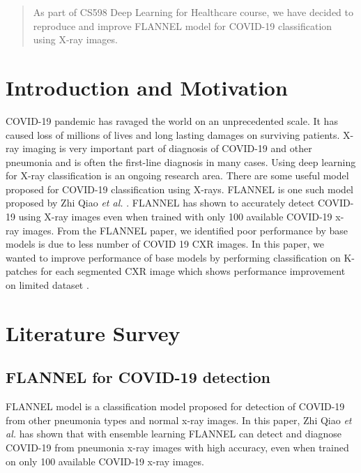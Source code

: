 \documentclass{sigkddExp}
\begin{document}
\date{28 March 2021}
\maketitle
\begin{abstract}
    As part of CS598 Deep Learning for Healthcare course, we have decided to
    reproduce and improve FLANNEL model\cite{10.1093/jamia/ocaa280} for COVID-19
    classification using X-ray images.
\end{abstract}

\section{Introduction and Motivation}
COVID-19 pandemic has ravaged the world on an unprecedented scale. It has caused
loss of millions of lives and long lasting damages on surviving patients. X-ray
imaging is very important part of diagnosis of COVID-19 and other pneumonia and
is often the first-line diagnosis in many cases. Using deep learning for X-ray
classification is an ongoing research area. There are some useful model proposed
for COVID-19 classification using X-rays. FLANNEL is one such model proposed by
Zhi Qiao \textit{et al.} \cite{10.1093/jamia/ocaa280}. FLANNEL has shown to
accurately detect COVID-19 using X-ray images even when trained with only 100
available COVID-19 x-ray images. From the FLANNEL paper, we identified poor
performance by base models is due to less number of COVID 19 CXR images. In this
paper, we wanted to improve performance of base models by performing
classification on K-patches for each segmented CXR image which shows performance
improvement on limited dataset \cite{pmid32396075}.


\section{Literature Survey}

\subsection{FLANNEL for COVID-19 detection}

FLANNEL model \cite{10.1093/jamia/ocaa280} is a classification model proposed
for detection of COVID-19 from other pneumonia types and normal x-ray images. In
this paper, Zhi Qiao \textit{et al.} has shown that with ensemble learning
FLANNEL can detect and diagnose COVID-19 from pneumonia x-ray images with high
accuracy, even when trained on only 100 available COVID-19 x-ray images.
\end{document}

